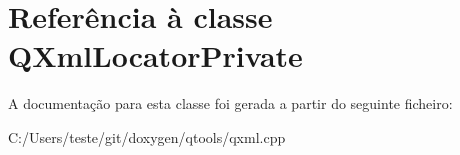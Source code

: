 \hypertarget{class_q_xml_locator_private}{\section{Referência à classe Q\-Xml\-Locator\-Private}
\label{class_q_xml_locator_private}
}


A documentação para esta classe foi gerada a partir do seguinte ficheiro\-:\begin{DoxyCompactItemize}
\item 
C\-:/\-Users/teste/git/doxygen/qtools/qxml.\-cpp\end{DoxyCompactItemize}
